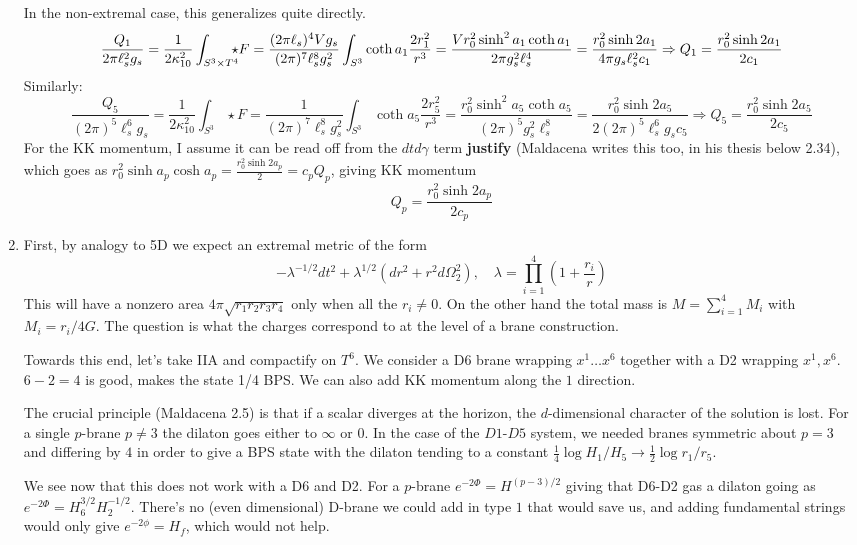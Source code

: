\documentclass[11pt, class=article, crop=false]{standalone}
\begin{document}
\begin{enumerate}
	In the non-extremal case, this generalizes quite directly. 
	\[
		\frac{Q_1}{2 \pi \ell_s^2 g_s} = \frac{1}{2\kappa_{10}^2} \int_{S^3 \times T^4}  \hspace{-.1in}\star F = \frac{(2 \pi \ell_s)^4 V g_s}{(2\pi)^7 \ell_s^8 g_s^2} \int_{S^3} \coth a_1 \frac{2 r_1^2}{r^3} = \frac{V r_0^2 \sinh^2 a_1 \coth a_1}{2\pi g_s^2 \ell_s^4} = \frac{r_0^2 \sinh 2a_1 }{4\pi g_s \ell_s^2 c_1} \Rightarrow Q_1 = \frac{r_0^2 \sinh 2 a_1}{2 c_1}
	\]
	Similarly: 
	\[
		\frac{Q_5}{(2 \pi)^5 \ell_s^6 g_s} = \frac{1}{2\kappa_{10}^2} \int_{S^3}  \star F = \frac{1}{(2\pi)^7 \ell_s^8 g_s^2} \int_{S^3} \coth a_5 \frac{2 r_5^2}{r^3} = \frac{r_0^2 \sinh^2 a_5 \coth a_5}{(2 \pi)^5 g_s^2 \ell_s^8} = \frac{r_0^2 \sinh 2a_5}{2 (2 \pi)^5 \ell_s^6 g_s c_5} \Rightarrow Q_5 = \frac{r_0^2 \sinh 2 a_5}{2 c_5}
	\]
	For the KK momentum, I assume it can be read off from the $dt d\gamma$ term \textbf{justify} (Maldacena writes this too, in his thesis below 2.34), which goes as $r_0^2 \sinh a_p \cosh a_p = \frac{r_0^2 \sinh 2a_p}{2} = c_p Q_p$, giving KK momentum
	\[
		Q_p = \frac{r_0^2 \sinh 2a_p}{2 c_p}
	\]
	
	\item 
	First, by analogy to 5D we expect an extremal metric of the form
	\[
		- \lambda^{-1/2} dt^2 + \lambda^{1/2} (dr^2 + r^2 d\Omega_2^2), \quad \lambda = \prod_{i=1}^4 (1 + \frac{r_i}{r})
	\]
	This will have a nonzero area $4 \pi \sqrt{r_1 r_2 r_3 r_4}$ only when all the $r_i \neq 0$. On the other hand the total mass is $M = \sum_{i=1}^4 M_i$ with $M_i = r_i/4G$. The question is what the charges correspond to at the level of a brane construction. 
	
	Towards this end, let's take IIA and compactify on $T^6$. We consider a D6 brane wrapping $x^1 \dots x^6$ together with a D2 wrapping $x^1, x^6$. $6-2=4$ is good, makes the state 1/4 BPS. We can also add KK momentum along the $1$ direction. 
	
	The crucial principle (Maldacena 2.5) is that if a scalar diverges at the horizon, the $d$-dimensional character of the solution is lost. For a single $p$-brane $p \neq 3$ the dilaton goes either to $\infty$ or $0$. In the case of the $D1$-$D5$ system, we needed branes symmetric about $p=3$ and differing by $4$ in order to give a BPS state with the dilaton tending to a constant $\frac14 \log H_1/H_5 \to \frac12 \log r_1/r_5$.
	
	We see now that this does not work with a D6 and D2. For a $p$-brane $e^{-2 \Phi} = H^{(p-3)/2}$ giving that D6-D2 gas a dilaton going as $e^{-2 \Phi} = H_6^{3/2} H_2^{-1/2}$. There's no (even dimensional) D-brane we could add in type $1$ that would save us, and adding fundamental strings would only give $e^{-2 \phi} = H_f$, which would not help. 
	

\end{enumerate}
\end{document}
